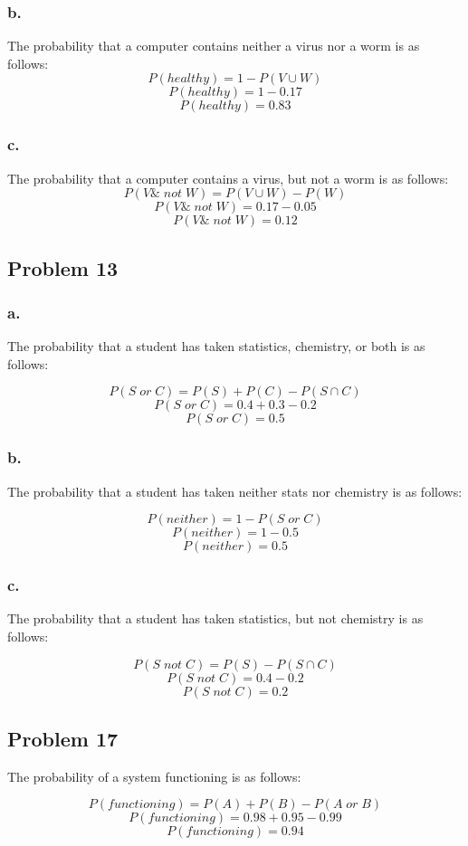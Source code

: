 \documentclass[11pt]{article}
\begin{document}
\subsubsection*{b.}
The probability that a computer contains neither a virus nor a worm is as
follows:
\[ P(healthy) = 1 - P(V \cup W) \]
\[ P(healthy) = 1 - 0.17 \]
\[ P(healthy) = 0.83 \]

\subsubsection*{c.}
The probability that a computer contains a virus, but not a worm is as follows:
\[ P(V\&\;not\;W) = P(V \cup W) - P(W) \]
\[ P(V\&\;not\;W) = 0.17 - 0.05 \]
\[ P(V\&\;not\;W) = 0.12 \]

\subsection*{Problem 13}
\subsubsection*{a.}
The probability that a student has taken statistics, chemistry, or both is as
follows:

\[ P(S\;or\;C) = P(S) + P(C) - P(S\cap C)\]
\[ P(S\;or\;C) = 0.4 + 0.3 - 0.2 \]
\[ P(S\;or\;C) = 0.5 \]

\subsubsection*{b.}
The probability that a student has taken neither stats nor chemistry is as
follows:

\[ P(neither) = 1 - P(S\;or\;C) \]
\[ P(neither) = 1 - 0.5 \]
\[ P(neither) = 0.5 \]

\subsubsection*{c.}
The probability that a student has taken statistics, but not chemistry is as
follows:

\[ P(S\;not\;C) = P(S) - P(S\cap C) \]
\[ P(S\;not\;C) = 0.4 - 0.2 \]
\[ P(S\;not\;C) = 0.2 \]

\subsection*{Problem 17}
The probability of a system functioning is as follows:

\[ P(functioning) = P(A) + P(B) - P(A\;or\;B) \]
\[ P(functioning) = 0.98 + 0.95 - 0.99 \]
\[ P(functioning) = 0.94 \]
\end{document}
